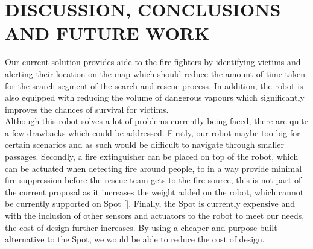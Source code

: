 \section{DISCUSSION, CONCLUSIONS AND FUTURE WORK}\label{Sec:concl}
Our current solution provides aide to the fire fighters by identifying victims and alerting their location on the map which should reduce the amount of time taken for the search segment of the search and rescue process. In addition, the robot is also equipped with reducing the volume of dangerous vapours which significantly improves the chances of survival for victims.\\

Although this robot solves a lot of problems currently being faced, there are quite a few drawbacks which could be addressed. Firstly, our robot maybe too big for certain scenarios and as such would be difficult to navigate through smaller passages. Secondly, a fire extinguisher can be placed on top of the robot, which can be actuated when detecting fire around people, to in a way provide minimal fire suppression before the rescue team gets to the fire source, this is not part of the current proposal as it increases the weight added on the robot, which cannot be currently supported on Spot []. Finally, the Spot is currently expensive and with the inclusion of other sensors and actuators to the robot to meet our needs, the cost of design further increases. By using a cheaper and purpose built alternative to the Spot, we would be able to reduce the cost of design.